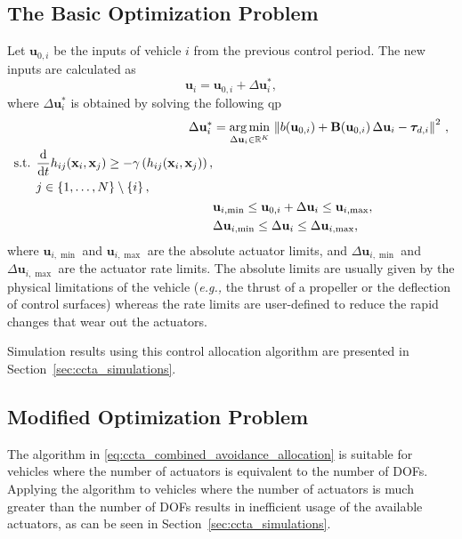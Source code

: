 \subsection{The Basic Optimization Problem}
Let $\mathbf{u}_{0,i}$ be the inputs of vehicle $i$ from the previous control period.
The new inputs are calculated as
\begin{equation}
    \mathbf{u}_{i} = \mathbf{u}_{0,i} + \Delta\mathbf{u}_{i}^*,
\end{equation}
where $\Delta\mathbf{u}_{i}^*$ is obtained by solving the following \gls{qp}
\begin{subequations}
    \begin{align}
        \Delta\mathbf{u}_{i}^* &= \operatorname*{arg\,min}_{\Delta\mathbf{u}_{i}\in\mathbb{R}^{K}}\,\left\| b(\mathbf{u}_{0,i}) + \mathbf{B}(\mathbf{u}_{0,i})\,\Delta\mathbf{u}_{i} - \bm{\tau}_{d,i} \right\|^2\,, \label{eq:ccta_combined_avoidance_allocation_criterion} \\
        \begin{split}
            \text{s.t. }& \frac{{\rm d}}{{\rm d}t}h_{ij}(\mathbf{x}_{i}, \mathbf{x}_{j}) \geq - \gamma\left(h_{ij}(\mathbf{x}_{i}, \mathbf{x}_{j})\right), \\
            & j \in \left\{ 1, \ldots, N \right\} \setminus \left\{ i \right\},
        \end{split} \label{eq:ccta_combined_avoidance_allocation_constraint} \\
        & \mathbf{u}_{i,\min} \leq \mathbf{u}_{0,i} + \Delta\mathbf{u}_{i} \leq \mathbf{u}_{i,\max}, \\
        & \Delta\mathbf{u}_{i,\min} \leq \Delta\mathbf{u}_{i} \leq \Delta\mathbf{u}_{i,\max}, \label{eq:ccta_combined_avoidance_allocation_delta_u}
    \end{align}
    \label{eq:ccta_combined_avoidance_allocation}
\end{subequations}
\noindent where $\mathbf{u}_{i,\min}$ and $\mathbf{u}_{i,\max}$ are the absolute actuator limits, and $\Delta\mathbf{u}_{i,\min}$ and $\Delta\mathbf{u}_{i,\max}$ are the actuator rate limits.
The absolute limits are usually given by the physical limitations of the vehicle (\emph{e.g.,} the thrust of a propeller or the deflection of control surfaces) whereas the rate limits are user-defined to reduce the rapid changes that wear out the actuators.

Simulation results using this control allocation algorithm are presented in Section~\ref{sec:ccta_simulations}.

\subsection{Modified Optimization Problem}
The algorithm in \eqref{eq:ccta_combined_avoidance_allocation} is suitable for vehicles where the number of actuators is equivalent to the number of DOFs.
Applying the algorithm to vehicles where the number of actuators is much greater than the number of DOFs results in inefficient usage of the available actuators, as can be seen in Section~\ref{sec:ccta_simulations}.

